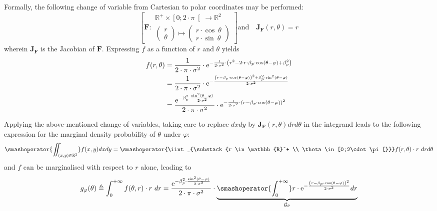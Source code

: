 Formally, the following change of variable from Cartesian to polar coordinates may be performed:
\begin{equation}
	\left[
	\mathbf{F}:
	\begin{array}{l}
		\mathbb{R}^{+} \times \left[0;2\cdot \pi\right[ \rightarrow \mathbb{R}^2 \\
		\begin{pmatrix}r \\ \theta \end{pmatrix} \mapsto \begin{pmatrix} r \cdot\cos\ \theta \\ r \cdot\sin\ \theta \end{pmatrix}
	\end{array}
	\right]
	\text{and} \quad \mathbf{J_F}(r, \theta) = r
\end{equation}
wherein $\mathbf{J_F}$ is the Jacobian of $\mathbf{F}$. Expressing $f$ as a function of $r$ and $\theta$ yields
\begin{equation}
	\begin{aligned}
		f(r,\theta) &= \frac{1}{2 \cdot \pi \cdot \sigma^2} \cdot 	\mathrm{e}^{-\frac{1}{2 \cdot \sigma^2}\cdot \left(r^2-2\cdot r \cdot \beta_p \cdot\cos(\theta - \varphi) + \beta_p^2\right)}\\
		&= \frac{1}{2 \cdot \pi \cdot \sigma^2} \cdot 	\mathrm{e}^{-\frac{\left(r- \beta_p \cdot\cos(\theta - \varphi)\right)^2 + \beta_p^2 \cdot \sin^2(\theta - \varphi )}{2 \cdot \sigma^2}}\\
		&= \frac{\mathrm{e}^{- \beta_p^2 \cdot \frac{\sin^2(\theta - \varphi)}{2\cdot \sigma^2}}}{2 \cdot \pi \cdot \sigma^2} \cdot \mathrm{e}^{-\frac{1}{2 \cdot \sigma^2}\cdot \left(r- \beta_p \cdot\cos(\theta - \varphi)\right)^2}
	\end{aligned}
\end{equation}

Applying the above-mentioned change of variables, taking care to replace $dxdy$ by $\mathbf{J_F}(r, \theta)drd\theta$ in the integrand leads to the following expression for the marginal density probability of $\theta$ under $\varphi$:
\begin{equation}
	\smashoperator{\iint_{(x,y) \in \mathbb{R}^2}} f(x,y) dxdy = \smashoperator{\iint_{\substack{r \in \mathbb{R}^+ \\ \theta \in [0;2\cdot \pi[}}} f(r,\theta) \cdot r \ drd\theta
\end{equation}
and $f$ can be marginalised with respect to $r$ alone, leading to
\begin{equation}
	g_\varphi(\theta) \triangleq \int_{0}^{+\infty}f(\theta, r) \cdot r \ dr = \frac{\e^{- \beta_p^2 \cdot \frac{\sin^2(\theta - \varphi)}{2\cdot \sigma^2}}}{2 \cdot \pi \cdot \sigma^2} \cdot \underbrace{\smashoperator{\int_{0}^{+\infty}} r\cdot \e^{-\frac{\left(r- \beta_p \cdot\cos(\theta - \varphi)\right)^2}{2 \cdot \sigma^2}} dr}_{\mathcal{G}_\theta}
\end{equation}

